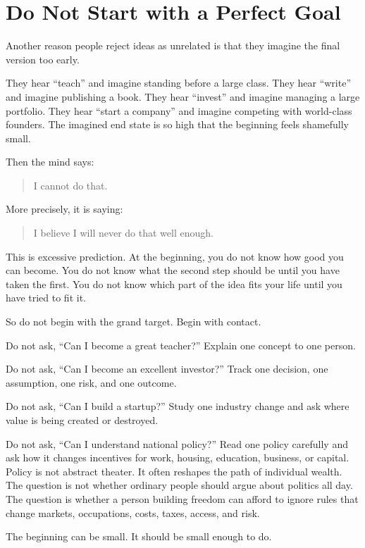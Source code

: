 \section*{Do Not Start with a Perfect Goal}

Another reason people reject ideas as unrelated is that they imagine the final version too early.

They hear ``teach'' and imagine standing before a large class. They hear ``write'' and imagine publishing a book. They hear ``invest'' and imagine managing a large portfolio. They hear ``start a company'' and imagine competing with world-class founders. The imagined end state is so high that the beginning feels shamefully small.

Then the mind says:

\begin{quote}
I cannot do that.
\end{quote}

More precisely, it is saying:

\begin{quote}
I believe I will never do that well enough.
\end{quote}

This is excessive prediction. At the beginning, you do not know how good you can become. You do not know what the second step should be until you have taken the first. You do not know which part of the idea fits your life until you have tried to fit it.

So do not begin with the grand target. Begin with contact.

Do not ask, ``Can I become a great teacher?'' Explain one concept to one person.

Do not ask, ``Can I become an excellent investor?'' Track one decision, one assumption, one risk, and one outcome.

Do not ask, ``Can I build a startup?'' Study one industry change and ask where value is being created or destroyed.

Do not ask, ``Can I understand national policy?'' Read one policy carefully and ask how it changes incentives for work, housing, education, business, or capital. Policy is not abstract theater. It often reshapes the path of individual wealth. The question is not whether ordinary people should argue about politics all day. The question is whether a person building freedom can afford to ignore rules that change markets, occupations, costs, taxes, access, and risk.

The beginning can be small. It should be small enough to do.


